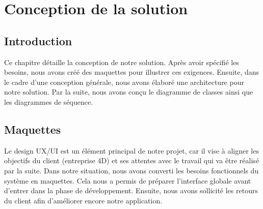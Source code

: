 

\chapter{Conception de la solution}
\pagestyle{chapterstyle}

\newpage
\vspace{1cm}

\section{Introduction}

Ce chapitre détaille la conception de notre solution. Après avoir spécifié 
les besoins, nous avons créé des maquettes pour illustrer 
ces exigences. Ensuite, dans le cadre d'une conception générale, nous avons 
élaboré une architecture pour notre solution. Par la suite, nous avons 
conçu le diagramme de classes ainsi que les diagrammes de séquence.


\section{Maquettes}
Le design UX/UI est un élément principal de notre projet, 
car il vise à aligner les objectifs du client (entreprise 4D) et ses attentes avec 
le travail qui va être réalisé par la suite.
\newline
Dans notre situation, nous avons converti les besoins fonctionnels du système 
en maquettes. Cela nous a permis de préparer l'interface globale 
avant d'entrer dans la phase de développement. Ensuite, 
nous avons sollicité les retours du client 
afin d'améliorer encore notre application.
\newline



